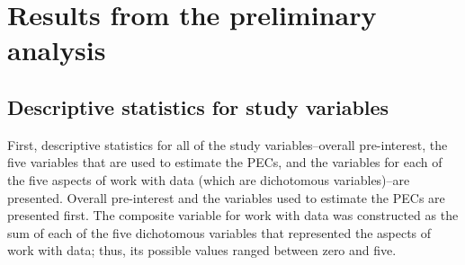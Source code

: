 \documentclass[]{msu-thesis}
\theoremstyle{definition}
\theoremstyle{definition}
\theoremstyle{definition}
\theoremstyle{remark}
\begin{document}
\section{Results from the preliminary
analysis}\label{results-from-the-preliminary-analysis}

\subsection{Descriptive statistics for study
variables}\label{descriptive-statistics-for-study-variables}

First, descriptive statistics for all of the study variables--overall
pre-interest, the five variables that are used to estimate the PECs, and
the variables for each of the five aspects of work with data (which are
dichotomous variables)--are presented. Overall pre-interest and the
variables used to estimate the PECs are presented first. The composite
variable for work with data was constructed as the sum of each of the
five dichotomous variables that represented the aspects of work with
data; thus, its possible values ranged between zero and five.
\end{document}
